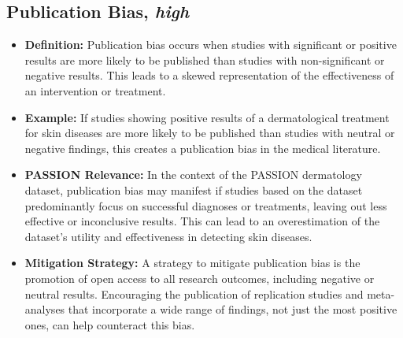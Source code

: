 \begin{refsection}
	\subsection{Publication Bias, \textit{high}}
	\begin{itemize}
		\item \textbf{Definition:} Publication bias occurs when studies with significant or positive results are more likely to be published than studies with non-significant or negative results. This leads to a skewed representation of the effectiveness of an intervention or treatment.
		\item \textbf{Example:} If studies showing positive results of a dermatological treatment for skin diseases are more likely to be published than studies with neutral or negative findings, this creates a publication bias in the medical literature.
		\item \textbf{PASSION Relevance:} In the context of the PASSION dermatology dataset, publication bias may manifest if studies based on the dataset predominantly focus on successful diagnoses or treatments, leaving out less effective or inconclusive results. This can lead to an overestimation of the dataset’s utility and effectiveness in detecting skin diseases.
		\item \textbf{Mitigation Strategy:} A strategy to mitigate publication bias is the promotion of open access to all research outcomes, including negative or neutral results. Encouraging the publication of replication studies and meta-analyses that incorporate a wide range of findings, not just the most positive ones, can help counteract this bias.
	\end{itemize}
	

\end{refsection}
